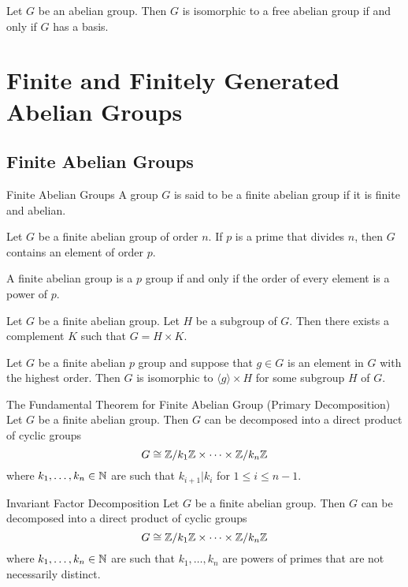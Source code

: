 \documentclass[a4paper]{article}
\begin{document}
\begin{prp}{}{} Let $G$ be an abelian group. Then $G$ is isomorphic to a free abelian group if and only if $G$ has a basis. 
\end{prp}

\pagebreak
\section{Finite and Finitely Generated Abelian Groups}
\subsection{Finite Abelian Groups}
\begin{defn}{Finite Abelian Groups}{} A group $G$ is said to be a finite abelian group if it is finite and abelian. 
\end{defn}

\begin{lmm}{}{} Let $G$ be a finite abelian group of order $n$. If $p$ is a prime that divides $n$, then $G$ contains an element of order $p$. 
\end{lmm}

\begin{lmm}{}{} A finite abelian group is a $p$ group if and only if the order of every element is a power of $p$. 
\end{lmm}

\begin{lmm}{}{} Let $G$ be a finite abelian group. Let $H$ be a subgroup of $G$. Then there exists a complement $K$ such that $G=H\times K$. 
\end{lmm}

\begin{lmm}{}{} Let $G$ be a finite abelian $p$ group and suppose that $g\in G$ is an element in $G$ with the highest order. Then $G$ is isomorphic to $\langle g\rangle\times H$ for some subgroup $H$ of $G$. 
\end{lmm}

\begin{thm}{The Fundamental Theorem for Finite Abelian Group (Primary Decomposition)}{} Let $G$ be a finite abelian group. Then $G$ can be decomposed into a direct product of cyclic groups $$G\cong\mathbb{Z}/k_1\mathbb{Z}\times\dots\times\mathbb{Z}/k_n\mathbb{Z}$$ where $k_1,\dots,k_n\in\mathbb{N}$ are such that $k_{i+1}|k_i$ for $1\leq i\leq n-1$. 
\end{thm}

\begin{thm}{Invariant Factor Decomposition}{} Let $G$ be a finite abelian group. Then $G$ can be decomposed into a direct product of cyclic groups $$G\cong\mathbb{Z}/k_1\mathbb{Z}\times\dots\times\mathbb{Z}/k_n\mathbb{Z}$$ where $k_1,\dots,k_n\in\mathbb{N}$ are such that $k_1,\dots,k_n$ are powers of primes that are not necessarily distinct. 
\end{thm}
\end{document}
